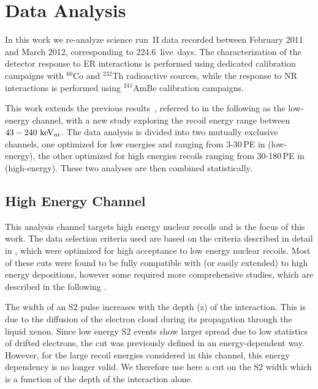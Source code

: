\section{Data Analysis}
\label{sec:Analysis}
In this work we re-analyze science run~II data recorded between February 2011 and March 2012, 
corresponding to 224.6~live~days. The characterization of the detector response to ER interactions is performed using dedicated calibration campaigns with $^{60}$Co and $^{232}$Th radioactive sources, while the response to NR interactions is performed using $^{241}$AmBe calibration campaigns.

 
This work extends the previous results~\cite{xe100_run10_si,xe100_run_combination}, referred to in the following as the low-energy channel, with a new study exploring the recoil energy range between $43-240~\mathrm{keV_\mathrm{nr}}$. 
The data analysis is divided into two mutually exclusive channels, one optimized for low energies and ranging from 3-30\,PE in \cSi (low-energy), 
the other optimized for high energies recoils ranging from 30-180\,PE in \cSi (high-energy). These two analyses are then combined statistically. 


\subsection{High Energy Channel}
\label{subsubsec:HighE}
This analysis channel targets high energy nuclear recoils and is the focus of this work. The data selection criteria used are based on the criteria described in detail in \cite{Aprile:2012vw}, which were optimized for high acceptance to low energy nuclear recoils. Most of these cuts were found to be fully compatible with (or easily extended) to high energy depositions, however some required more comprehensive studies, which are described in the following . 


The width of an S2 pulse increases with the depth (z) of the interaction. This is due to the diffusion of the electron cloud during its propagation
through the liquid xenon. Since low energy S2 events show larger spread
due to low statistics of drifted electrons, the cut was previously defined in an energy-dependent way. However, for the large recoil energies considered in this channel, this energy dependency is no longer valid. We therefore use here a cut on the S2 width which is a function of the depth of the interaction alone. 

